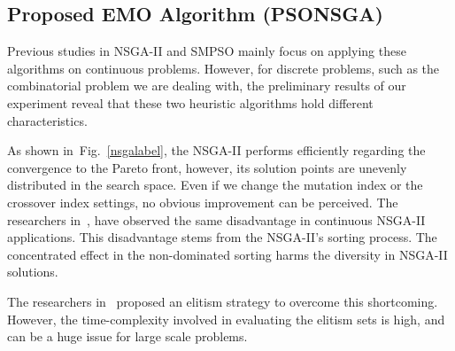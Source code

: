\documentclass[10pt,journal,compsoc]{IEEEtran}
\newcommand{\Fig}[1]{Fig.~\ref{#1}}
\begin{document}
\subsection{Proposed EMO Algorithm (PSONSGA)}
Previous studies in NSGA-II and SMPSO mainly focus on applying these algorithms on continuous problems. 
However, for discrete problems, such as the combinatorial problem we are dealing with, the preliminary results of our experiment reveal that these two heuristic algorithms hold different characteristics.

As shown in~\Fig{nsgalabel}, the NSGA-II performs efficiently regarding the convergence to the Pareto front, however, its solution points are unevenly distributed in the search space. Even if we change the mutation index or the crossover index settings, no obvious improvement can be perceived. The researchers in~\cite{doi:10.1163/156939308784160703}, have observed the same disadvantage in continuous NSGA-II applications. This disadvantage stems from the NSGA-II's sorting process. The concentrated effect in the non-dominated sorting harms the diversity in NSGA-II solutions. 

The researchers in~\cite{doi:10.1163/156939308784160703} proposed an elitism strategy to overcome this shortcoming. However, the time-complexity involved in evaluating the elitism sets is high, and can be a huge issue for large scale problems.
\end{document}
